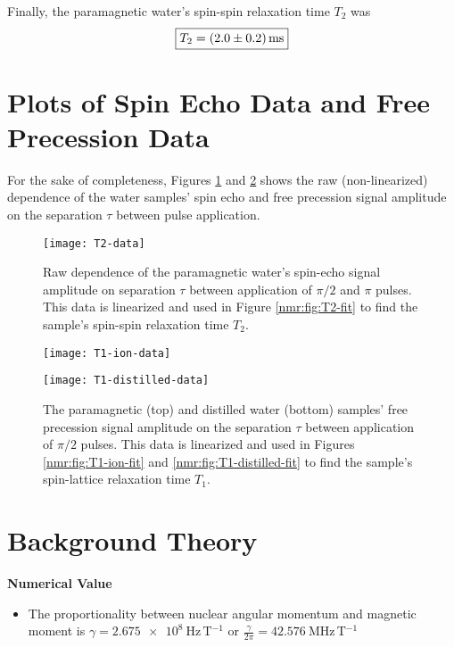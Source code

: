 \documentclass[11pt, a4paper]{article}
\begin{document}
Finally, the paramagnetic water's spin-spin relaxation time $ T_{2} $ was
\begin{equation*}
	\boxed{T_{2} = \SI{2.0 \pm 0.2}{\milli \second}}
\end{equation*}
		
		
\appendix

\section{Plots of Spin Echo Data and Free Precession Data}
For the sake of completeness, Figures \ref{nmr:fig:T2_data} and \ref{nmr:fig:T1_data} shows the raw (non-linearized) dependence of the water samples' spin echo and free precession signal amplitude on the separation $ \tau $ between pulse application.

\begin{figure}[htb!]
\centering

\texttt{[image: T2-data]}

\caption{Raw dependence of the paramagnetic water's spin-echo signal amplitude on separation $ \tau $ between application of $ \pi/2 $ and $ \pi $ pulses. This data is linearized and used in Figure \ref{nmr:fig:T2-fit} to find the sample's spin-spin relaxation time $ T_{2} $.}
\label{nmr:fig:T2_data}
\end{figure}


\begin{figure}[htb!]
\centering

\texttt{[image: T1-ion-data]} \vfill

\texttt{[image: T1-distilled-data]} \vfill

\caption{The paramagnetic (top) and distilled water (bottom) samples' free precession signal amplitude on the separation $ \tau $ between application of $ \pi/2 $ pulses. This data is linearized and used in Figures \ref{nmr:fig:T1-ion-fit} and \ref{nmr:fig:T1-distilled-fit} to find the sample's spin-lattice relaxation time $ T_{1} $.}
\label{nmr:fig:T1_data}
\end{figure}



\section{Background Theory}

\textbf{Numerical Value}
\begin{itemize}
	\item The proportionality between nuclear angular momentum and magnetic moment is $ \gamma = \SI{2.675e8}{\hertz\, \tesla^{-1}} $ or $ \frac{\gamma}{2\pi} = \SI{42.576}{\mega \hertz\, \tesla^{-1}} $
\end{itemize}
\end{document}
